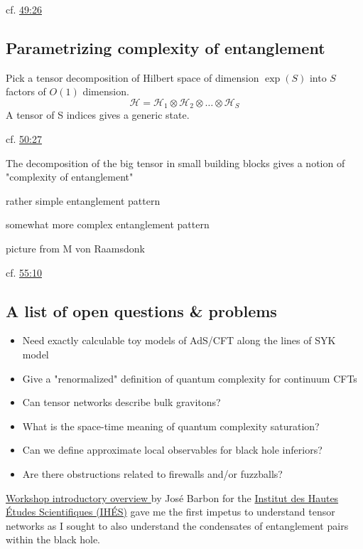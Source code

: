 cf. \href{https://youtu.be/nsxgAOAEgbg?t=49m26s}{49:26}  

\subsection*{Parametrizing complexity of entanglement}

Pick a tensor decomposition of Hilbert space of dimension $\exp{(S)}$ into $S$ factors of $O(1)$ dimension.  
\[
\mathcal{H} = \mathcal{H}_1 \otimes \mathcal{H}_2 \otimes \dots \otimes \mathcal{H}_S
\]
A tensor of S indices gives a generic state.  

cf. \href{https://youtu.be/nsxgAOAEgbg?t=50m27s}{50:27}  

The decomposition of the big tensor in small building blocks gives a notion of "complexity of entanglement"  

rather simple entanglement pattern  

somewhat more complex entanglement pattern

picture from M von Raamsdonk  

cf. \href{https://youtu.be/nsxgAOAEgbg?t=55m10s}{55:10}

\subsection*{A list of open questions \& problems}

\begin{itemize}
\item Need exactly calculable toy models of AdS/CFT along the lines of SYK model  
\item Give a "renormalized" definition of quantum complexity for continuum CFTs 
\item Can tensor networks describe bulk gravitons?  
\item What is the space-time meaning of quantum complexity saturation?  
\item Can we define approximate local observables for black hole inferiors?  
\item Are there obstructions related to firewalls and/or fuzzballs?   
\end{itemize}

\href{https://youtu.be/nsxgAOAEgbg}{Workshop introductory overview } by Jos\'{e} Barbon for the \href{https://www.youtube.com/channel/UC4R1IsRVKs_qlWKTm9pT82Q}{Institut des Hautes Études Scientifiques (IHÉS)} gave me the first impetus to understand tensor networks as I sought to also understand the condensates of entanglement pairs within the black hole.  

